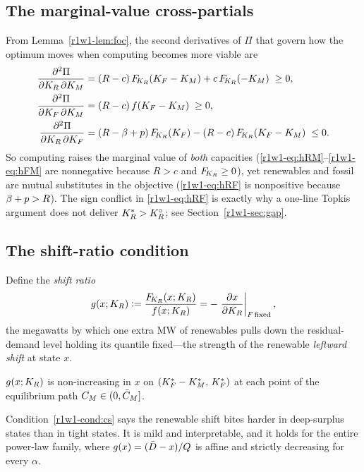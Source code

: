 \subsection{The marginal-value cross-partials}
From Lemma~\ref{r1w1-lem:foc}, the second derivatives of $\Pi$ that govern how the
optimum moves when computing becomes more viable are
\begin{align}
  \frac{\partial^2\Pi}{\partial K_R\,\partial K_M}
    &=(R-c)\,F_{\!K_R}(K_F-K_M)+c\,F_{\!K_R}(-K_M)\;\ge 0,\label{r1w1-eq:hRM}\\
  \frac{\partial^2\Pi}{\partial K_F\,\partial K_M}
    &=(R-c)\,f(K_F-K_M)\;\ge 0,\label{r1w1-eq:hFM}\\
  \frac{\partial^2\Pi}{\partial K_R\,\partial K_F}
    &=(R-\beta+p)\,F_{\!K_R}(K_F)-(R-c)\,F_{\!K_R}(K_F-K_M)\;\le 0.\label{r1w1-eq:hRF}
\end{align}
So computing raises the marginal value of \emph{both} capacities
(\eqref{r1w1-eq:hRM}--\eqref{r1w1-eq:hFM} are nonnegative because $R>c$ and $F_{\!K_R}\ge0$),
yet renewables and fossil are mutual substitutes in the objective
(\eqref{r1w1-eq:hRF} is nonpositive because $\beta+p>R$). The sign conflict in
\eqref{r1w1-eq:hRF} is exactly why a one-line Topkis argument does not deliver
$K_R^{*}>K_R^{\circ}$; see Section~\ref{r1w1-sec:gap}.

\subsection{The shift-ratio condition}
Define the \emph{shift ratio}
\begin{equation}\label{r1w1-eq:shift}
  g(x;K_R)\vcentcolon=\frac{F_{\!K_R}(x;K_R)}{f(x;K_R)}
  =-\left.\frac{\partial x}{\partial K_R}\right|_{F\,\text{fixed}} ,
\end{equation}
the megawatts by which one extra MW of renewables pulls down the residual-demand
level holding its quantile fixed---the strength of the renewable
\emph{leftward shift} at state $x$.

\begin{condition}\label{r1w1-cond:cs}
$g(x;K_R)$ is non-increasing in $x$ on $(K_F^{*}-K_M^{*},\,K_F^{*})$ at each point of the
equilibrium path $C_M\in(0,\bar C_M]$.
\end{condition}

Condition~\ref{r1w1-cond:cs} says the renewable shift bites harder in deep-surplus
states than in tight states. It is mild and interpretable, and it holds for the
entire power-law family, where $g(x)=(\bar D-x)/Q$ is affine and strictly
decreasing for every $\alpha$.


